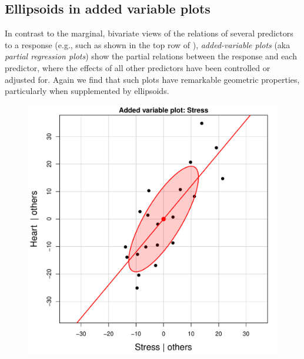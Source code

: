 \subsection{Ellipsoids in added variable plots}\label{sec:avp}

In contrast to the marginal, bivariate views of the relations of several predictors to a
response (e.g., such as shown in the top row of ), \emph{added-variable plots} 
(aka \emph{partial regression plots}) show the partial relations between the response and
each predictor, where the effects of all other predictors have been controlled or adjusted for.
Again we find that such plots have remarkable geometric properties, particularly
when supplemented by ellipsoids.

\begin{figure}[htb]
 \begin{minipage}[b]{.49\linewidth}
  \centering
  \includegraphics[width=1\linewidth]{fig/coffee-avplot1}
 \end{minipage}%
 \hfill
 \begin{minipage}[b]{.49\linewidth}
  \centering

\end{minipage}
\end{figure}
